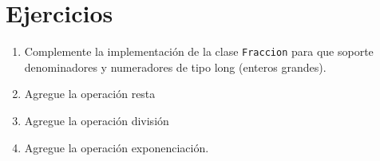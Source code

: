 \section{Ejercicios}
\begin{enumerate}
\item Complemente la implementación de la clase \texttt{Fraccion} para que
soporte denominadores y numeradores de tipo long (enteros grandes). 
\item Agregue la operación resta
\item Agregue la operación división
\item Agregue la operación exponenciación. 
\end{enumerate}

